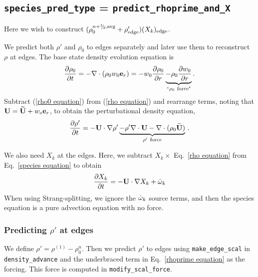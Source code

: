 \subsection{{\tt species\_pred\_type} = {\tt predict\_rhoprime\_and\_X}}

Here we wish to construct $(\rho_0^{n+\myhalf,{\rm avg}}        
+ \rho'_\mathrm{edge})(X_k)_\mathrm{edge}$.

We predict both $\rho'$ and $\rho_0$ to edges separately and later use them to 
reconstruct $\rho$ at edges.  The base state density evolution equation is
\begin{equation}
\frac{\partial\rho_0}{\partial t} = -\nabla\cdot(\rho_0 w_0 {\bf e}_r) = 
-w_0\frac{\partial\rho_0}{\partial r} 
\underbrace{-\rho_0\frac{\partial w_0}{\partial r}}_{``\rho_0 ~ \text{force"}}.
\label{rho0 equation}
\end{equation}
Subtract (\ref{rho0 equation}) from (\ref{rho equation}) and rearrange
terms, noting that ${\bf U} = \widetilde{{\bf U}} + w_o{\bf e}_r$, to obtain the
perturbational density equation,
\begin{equation}
\frac{\partial\rho'}{\partial t} = -{\bf U}\cdot\nabla\rho' \underbrace{- \rho'\nabla\cdot{\bf U} 
- \nabla\cdot(\rho_0\widetilde{{\bf U}})}_{\rho' ~ \text{force}} \, .
\label{rhoprime equation}
\end{equation}

We also need $X_k$ at the edges.  Here, we subtract $X_k \times$
Eq.~\ref{rho equation} from Eq.~\ref{species equation} to obtain
\begin{equation}
\frac{\partial X_k}{\partial t} = -{\bf U} \cdot \nabla X_k + \dot{\omega}_k
\end{equation}
When using Strang-splitting, we ignore the $\dot{\omega}_k$ source terms, and
then the species equation is a pure advection equation with no force.

\subsubsection{Predicting $\rho'$ at edges}
We define $\rho' = \rho^{(1)} - \rho_0^n$.  Then we predict $\rho'$ to
edges using {\tt make\_edge\_scal} in {\tt density\_advance} and the
underbraced term in Eq.~\ref{rhoprime equation} as the forcing.  This
force is computed in {\tt modify\_scal\_force}.

